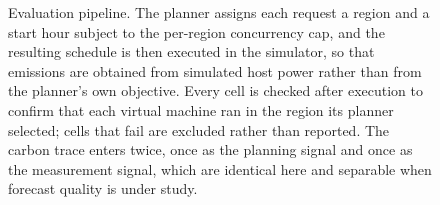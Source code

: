 \begin{figure}[t]
\caption{Evaluation pipeline. The planner assigns each request a region and a
start hour subject to the per-region concurrency cap, and the resulting schedule
is then executed in the simulator, so that emissions are obtained from simulated
host power rather than from the planner's own objective. Every cell is checked
after execution to confirm that each virtual machine ran in the region its
planner selected; cells that fail are excluded rather than reported. The carbon
trace enters twice, once as the planning signal and once as the measurement
signal, which are identical here and separable when forecast quality is under
study.}
\label{fig:pipeline}
\end{figure}


